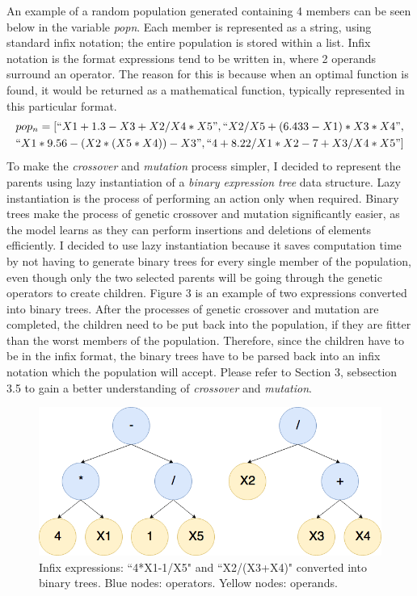 \documentclass[11pt]{article}
\begin{document}
An example of a random population generated containing 4 members can be seen below in the variable \textit{pop\textunderscore n}. Each member is represented as a string, using standard infix notation; the entire population is stored within a list. Infix notation is the format expressions tend to be written in, where 2 operands surround an operator. The reason for this is because when an optimal function is found, it would be returned as a mathematical function, typically represented in this particular format. 
\begin{align*}
pop_n = [``X1+1.3-X3+X2/X4*X5" ,``X2/X5+(6.433-X1)*X3*X4", \\
``X1*9.56-(X2*(X5*X4))-X3", ``4+8.22/X1*X2-7+X3/X4*X5"] 
\end{align*}
To make the \textit{crossover} and \textit{mutation} process simpler, I decided to represent the parents using lazy instantiation of a \textit{binary expression tree} data structure. Lazy instantiation is the process of performing an action only when required. Binary trees make the process of genetic crossover and mutation significantly easier, as the model learns as they can perform insertions and deletions of elements efficiently. I decided to use lazy instantiation because it saves computation time by not having to generate binary trees for every single member of the population, even though only the two selected parents will be going through the genetic operators to create children. Figure 3 is an example of two expressions converted into binary trees. After the processes of genetic crossover and mutation are completed, the children need to be put back into the population, if they are fitter than the worst members of the population. Therefore, since the children have to be in the infix format, the binary trees have to be parsed back into an infix notation which the population will accept. Please refer to Section 3, sebsection 3.5 to gain a better understanding of \textit{crossover} and \textit{mutation}.
\begin{figure}[h]
\centering
\includegraphics[scale = .40]{binaryT}
\caption{Infix expressions: ``4*X1-1/X5" and ``X2/(X3+X4)" converted into binary trees. Blue nodes: operators. Yellow nodes: operands. } 
\end{figure}
\end{document}
